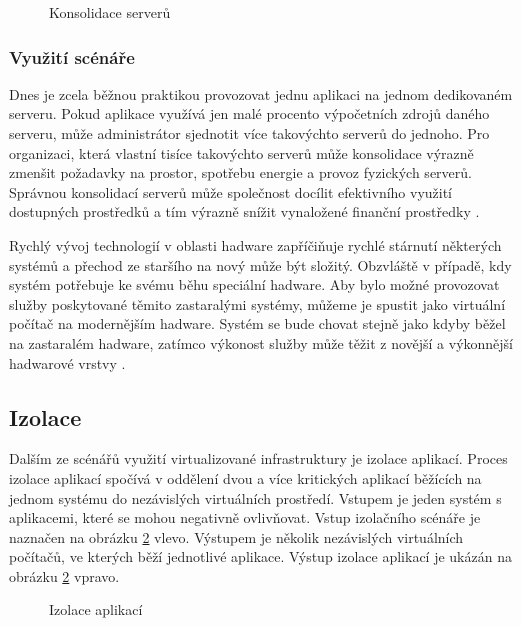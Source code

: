 \begin{figure}
    \centering    
    \caption{Konsolidace serverů}
    \label{consolidation_img}
\end{figure}

\subsubsection*{Využití scénáře}

Dnes je zcela běžnou praktikou provozovat jednu aplikaci na jednom dedikovaném serveru. Pokud aplikace využívá jen malé procento výpočetních zdrojů daného serveru, může administrátor sjednotit více takovýchto serverů
do jednoho. Pro organizaci, která vlastní tisíce takovýchto serverů může konsolidace výrazně zmenšit požadavky na prostor, spotřebu energie a provoz fyzických serverů. Správnou konsolidací serverů může společnost docílit
efektivního využití dostupných prostředků a tím výrazně snížit vynaložené finanční prostředky \cite{reasons}.

Rychlý vývoj technologií v oblasti hadware zapříčiňuje rychlé stárnutí některých systémů a přechod ze staršího na nový může být složitý. Obzvláště v případě, kdy systém potřebuje ke svému běhu speciální hadware.
Aby bylo možné provozovat služby poskytované těmito zastaralými systémy, můžeme je spustit jako virtuální počítač na modernějším hadware. Systém se bude chovat stejně jako kdyby běžel na zastaralém hadware, zatímco
výkonost služby může těžit z novější a výkonnější hadwarové vrstvy  \cite{reasons}.

\subsection{Izolace}

Dalším ze scénářů využití virtualizované infrastruktury je izolace aplikací. Proces izolace aplikací spočívá v oddělení dvou a více kritických aplikací běžících na jednom systému do nezávislých virtuálních prostředí.
Vstupem je jeden systém s aplikacemi, které se mohou negativně ovlivňovat. Vstup izolačního scénáře je naznačen na obrázku \ref{izolation} vlevo. Výstupem je několik nezávislých virtuálních počítačů, ve kterých běží
jednotlivé aplikace. Výstup izolace aplikací je ukázán na obrázku \ref{izolation} vpravo.

\begin{figure}
    \centering    
    \caption{Izolace aplikací}
    \label{izolation}
\end{figure}

